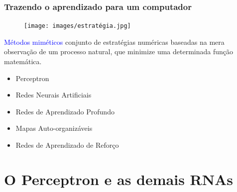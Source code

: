 \documentclass[aspectratio=169]{beamer} %
\begin{document}
\begin{frame}
	\frametitle{Trazendo o aprendizado para um computador}
	\begin{figure}
		\centering
		\texttt{[image: images/estratégia.jpg]} %
	\end{figure}	

	\pause

	\begin{minipage}{0.5\textwidth}
		\begin{tcolorbox}[colback=gray!5,colframe=blue!40!black,title=Estratégia 2]
			\justifying
			\textcolor{blue}{Métodos miméticos} conjunto de estratégias numéricas baseadas na mera observação de um processo natural, que minimize uma determinada função matemática.  
		\end{tcolorbox}
    \end{minipage}%
		\pause
    \begin{minipage}{0.5\textwidth}
        \begin{itemize}
			\item Perceptron
			\item Redes Neurais Artificiais
			\item Redes de Aprendizado Profundo
			\item Mapas Auto-organizáveis
			\item Redes de Aprendizado de Reforço
		   \end{itemize}
    \end{minipage}
\end{frame}


\section{O Perceptron e as demais RNAs}
\end{document}
